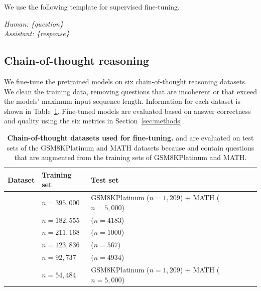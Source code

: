 \vspace{-0.5cm}
We use the following template for supervised fine-tuning.

\textit{Human: \{question\}} \\
\textit{Assistant: \{response\}}



\subsection{Chain-of-thought reasoning}
\label{app:ft-cot}


We fine-tune the pretrained models on six chain-of-thought reasoning datasets. We clean the training data, removing questions that are incoherent or that exceed the models' maximum input sequence length. Information for each dataset is shown in Table~\ref{table:ft-datasets-cot}. Fine-tuned models are evaluated based on answer correctness and quality using the six metrics in Section~\ref{sec:methods}.



\renewcommand{\arraystretch}{1.2} 
\begin{table}[H]
\centering
\begin{tabular}{llll}
\hline
\textbf{Dataset}   & \textbf{Training set} & \textbf{Test set} \\ 
\hline
\metamathqa{}      &  $n=395,000$   & GSM8KPlatinum ($n=1,209$) + MATH ($n=5,000$)     \\
\medmcqa{}         & $n=182,555$    & \medmcqa{} ($n=4183$)           \\
\pubmedqa{}        & $n=211,168$    & \pubmedqa{} ($n=1000$)            \\
\mmluprocot{}      & $n=123,836$    & \mmluprocot{} ($n=567$)           \\
\race{}            & $n=92,737$     & \race{} ($n=4934$)              \\
\simplescaling{}   & $n=54,484$     & GSM8KPlatinum ($n=1,209$) + MATH ($n=5,000$) \\ 
\hline
\end{tabular}
\vspace{0.2cm}
\caption{\textbf{Chain-of-thought datasets used for fine-tuning.} \metamathqa{} and \simplescaling{} are evaluated on test sets of the GSM8KPlatinum \cite{cobbe2021gsm8k,vendrow2025largelanguagemodelbenchmarks} and MATH \cite{hendrycksmath2021} datasets because \metamathqa{} and \simplescaling{} contain questions that are augmented from the training sets of GSM8KPlatinum and MATH.}
\label{table:ft-datasets-cot}
\end{table}


